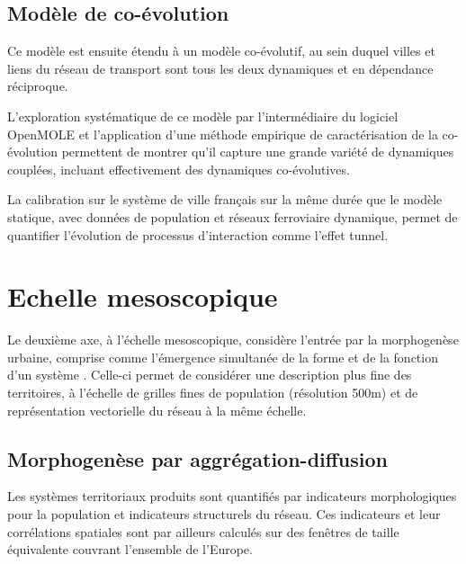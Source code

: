 \documentclass[11pt]{article}
\begin{document}
\subsection{Modèle de co-évolution}


Ce modèle est ensuite étendu à un modèle co-évolutif, au sein duquel villes et liens du réseau de transport sont tous les deux dynamiques et en dépendance réciproque. 



L'exploration systématique de ce modèle par l'intermédiaire du logiciel OpenMOLE \citep{reuillon2013openmole} et l'application d'une méthode empirique de caractérisation de la co-évolution \cite{raimbault2017identification} permettent de montrer qu'il capture une grande variété de dynamiques couplées, incluant effectivement des dynamiques co-évolutives.

La calibration sur le système de ville français sur la même durée que le modèle statique, avec données de population et réseaux ferroviaire dynamique, permet de quantifier l'évolution de processus d'interaction comme l'effet tunnel.


\section{Echelle mesoscopique}

Le deuxième axe, à l'échelle mesoscopique, considère l'entrée par la morphogenèse urbaine, comprise comme l'émergence simultanée de la forme et de la fonction d'un système \citep{doursat2012morphogenetic}. Celle-ci permet de considérer une description plus fine des territoires, à l'échelle de grilles fines de population (résolution 500m) et de représentation vectorielle du réseau à la même échelle. 

\subsection{Morphogenèse par aggrégation-diffusion}

Les systèmes territoriaux produits sont quantifiés par indicateurs morphologiques pour la population \citep{le2015forme} et indicateurs structurels du réseau. Ces indicateurs et leur corrélations spatiales sont par ailleurs calculés sur des fenêtres de taille équivalente couvrant l'ensemble de l'Europe.
\end{document}
